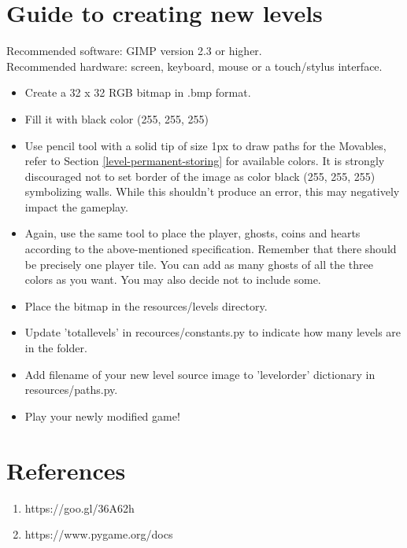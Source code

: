 \documentclass[11pt,a4paper,notitlepage]{report}
\begin{document}
	\chapter{Guide to creating new levels}
		\label{new_levels_guide}
		Recommended software: GIMP version 2.3 or higher.\\
		Recommended hardware: screen, keyboard, mouse or a touch/stylus interface.
		\begin{itemize}
			\item
				Create a 32 x 32 RGB bitmap in .bmp format.
			\item
				Fill it with black color (255, 255, 255)
			\item
				Use pencil tool with a solid tip of size 1px to draw paths for the Movables, refer to Section \ref{level-permanent-storing} for available colors.
				It is strongly discouraged not to set border of the image as color black (255, 255, 255) symbolizing walls. While this shouldn't produce an error, this may negatively impact the gameplay.
			\item
				Again, use the same tool to place the player, ghosts, coins and hearts according to the above-mentioned specification.
				Remember that there should be precisely one player tile. You can add as many ghosts of all the three colors as you want. You may also decide not to include some.
			\item
				Place the bitmap in the resources/levels directory.
			\item
				Update 'totallevels' in recources/constants.py to indicate how many levels are in the folder.
			\item
				Add filename of your new level source image to 'levelorder' dictionary in resources/paths.py.
			\item
				Play your newly modified game!
		\end{itemize}
	\chapter{References}
		\begin{enumerate}
			\item
				https://goo.gl/36A62h
				\label{stronaopacmanie}
			\item
				https://www.pygame.org/docs
				\label{pygamedocs}
		\end{enumerate}
			
\end{document}
